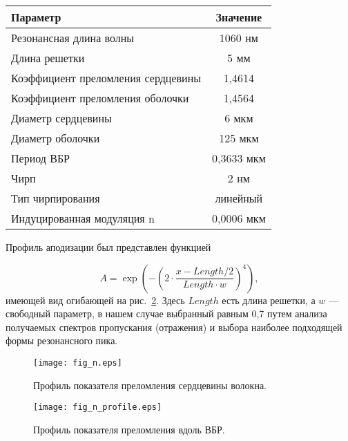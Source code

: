 \begin{center}
\begin{tabular}{|l|c|}
\hline \rule[-2ex]{0pt}{5.5ex} \textbf{Параметр} & \textbf{Значение} \\ \hline
\hline \rule[-2ex]{0pt}{5.5ex} Резонансная длина волны & 1060 нм \\
\hline \rule[-2ex]{0pt}{5.5ex} Длина решетки & 5 мм \\
\hline \rule[-2ex]{0pt}{5.5ex} Коэффициент преломления сердцевины & 1,4614 \\
\hline \rule[-2ex]{0pt}{5.5ex} Коэффициент преломления оболочки & 1,4564 \\
\hline \rule[-2ex]{0pt}{5.5ex} Диаметр сердцевины & 6 мкм \\
\hline \rule[-2ex]{0pt}{5.5ex} Диаметр оболочки & 125 мкм \\
\hline \rule[-2ex]{0pt}{5.5ex} Период ВБР & 0,3633 мкм \\
\hline \rule[-2ex]{0pt}{5.5ex} Чирп & 2 нм \\
\hline \rule[-2ex]{0pt}{5.5ex} Тип чирпирования & линейный \\
\hline \rule[-2ex]{0pt}{5.5ex} Индуцированная модуляция n & 0,0006 мкм \\
\hline
\end{tabular}
\end{center}
Профиль аподизации был представлен функцией

\begin{equation} \label{eq2.11}
    A=\exp\left(-\left(2\cdot\frac{x-Length/2}{Length\cdot w}\right)^4\right),
\end{equation}
имеющей вид огибающей на рис.~\ref{fig_n_profile}. Здесь $Length$ есть длина решетки, а $w$ --- свободный параметр, в нашем случае выбранный равным 0,7 путем анализа получаемых спектров пропускания (отражения) и выбора наиболее подходящей формы резонансного пика.

\begin{figure}
  \centering
  \texttt{[image: fig\_n.eps]}\\
  \caption{Профиль показателя преломления сердцевины волокна.}\label{fig_n}
\end{figure}

\begin{figure}
  \centering
  \texttt{[image: fig\_n\_profile.eps]}\\
  \caption{Профиль показателя преломления вдоль ВБР.}\label{fig_n_profile}
\end{figure}

